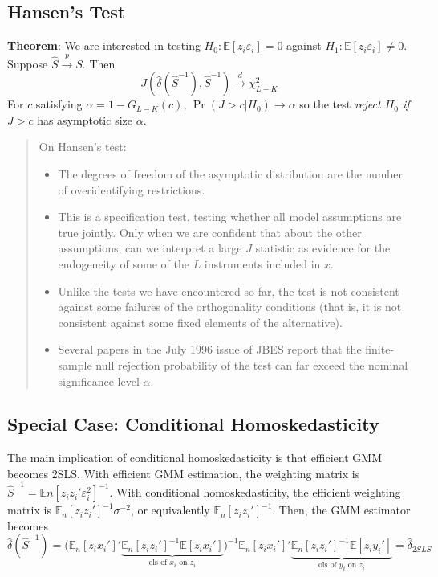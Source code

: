 \documentclass[12pt,]{book}
\providecommand{\tightlist}{%
  \setlength{\itemsep}{0pt}\setlength{\parskip}{0pt}}
\begin{document}
\hypertarget{hansens-test}{%
\subsection{Hansen's Test}\label{hansens-test}}

\textbf{Theorem}:
We are interested in testing \(H_0: \mathbb E[z_i \varepsilon_i] = 0\) against \(H_1: \mathbb E[z_i \varepsilon_i] \neq 0\). Suppose \(\hat{S} \overset{p}{\to} S\). Then
\[
    J(\hat{\delta}(\hat{S}^{-1}) , \hat{S}^{-1}) \overset{d}{\to} \chi^2 _ {L-K}
\]
For \(c\) satisfying \(\alpha = 1- G_{L - K} ( c )\), \(\Pr(J>c | H_0) \to \alpha\) so the test \emph{reject \(H_0\) if \(J > c\)} has asymptotic size \(\alpha\).

\begin{quote}
On Hansen's test:

\begin{itemize}
\tightlist
\item
  The degrees of freedom of the asymptotic distribution are the number of overidentifying restrictions.
\item
  This is a specification test, testing whether all model assumptions are true jointly. Only when we are confident that about the other assumptions, can we interpret a large \(J\) statistic as evidence for the endogeneity of some of the \(L\) instruments included in \(x\).
\item
  Unlike the tests we have encountered so far, the test is not consistent against some failures of the orthogonality conditions (that is, it is not consistent against some fixed elements of the alternative).
\item
  Several papers in the July 1996 issue of JBES report that the finite-sample null rejection probability of the test can far exceed the nominal significance level \(\alpha\).
\end{itemize}
\end{quote}

\hypertarget{special-case-conditional-homoskedasticity}{%
\subsection{Special Case: Conditional Homoskedasticity}\label{special-case-conditional-homoskedasticity}}

The main implication of conditional homoskedasticity is that efficient GMM becomes 2SLS. With efficient GMM estimation, the weighting matrix is \(\hat{S}^{-1} = \mathbb En [z_i z_i' \varepsilon_i^2]^{-1}\). With conditional homoskedasticity, the efficient weighting matrix is \(\mathbb E_n[z_iz_i']^{-1} \sigma^{-2}\), or equivalently \(\mathbb E_n[z_iz_i']^{-1}\). Then, the GMM estimator becomes
\[
    \hat{\delta}(\hat{S}^{-1}) = \Big(\mathbb E_n[z_i x_i']' \underbrace{\mathbb E_n[z_iz_i']^{-1} \mathbb E[z_i x_i']} _ {\text{ols of } x_i \text{ on }z_i} \Big)^{-1}\mathbb E_n[z_i x_i']' \underbrace{\mathbb E_n[z_iz_i']^{-1} \mathbb E[z_i y_i']} _ {\text{ols of } y_i \text{ on }z_i}= \hat{\delta} _ {2SLS}
\]
\end{document}
